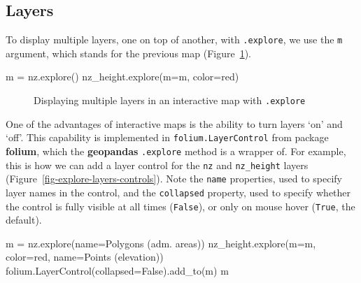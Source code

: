 \documentclass[
  letterpaper,
]{krantz}
\newenvironment{Shaded}{\begin{snugshade}}{\end{snugshade}}
\newcommand{\NormalTok}[1]{\textcolor[rgb]{0.00,0.23,0.31}{#1}}
\newcommand{\OperatorTok}[1]{\textcolor[rgb]{0.37,0.37,0.37}{#1}}
\newcommand{\StringTok}[1]{\textcolor[rgb]{0.13,0.47,0.30}{#1}}
\newcommand{\VariableTok}[1]{\textcolor[rgb]{0.07,0.07,0.07}{#1}}
\begin{document}
\subsection{Layers}\label{layers}

To display multiple layers, one on top of another, with
\texttt{.explore}, we use the \texttt{m} argument, which stands for the
previous map (Figure~\ref{fig-explore-layers}).

\begin{Shaded}
\begin{Highlighting}[]
\NormalTok{m }\OperatorTok{=}\NormalTok{ nz.explore()}
\NormalTok{nz\_height.explore(m}\OperatorTok{=}\NormalTok{m, color}\OperatorTok{=}\StringTok{\textquotesingle{}red\textquotesingle{}}\NormalTok{)}
\end{Highlighting}
\end{Shaded}

\begin{figure}


\caption{\label{fig-explore-layers}Displaying multiple layers in an
interactive map with \texttt{.explore}}

\end{figure}%

One of the advantages of interactive maps is the ability to turn layers
`on' and `off'. This capability is implemented in
\texttt{folium.LayerControl} from package \textbf{folium}, which the
\textbf{geopandas} \texttt{.explore} method is a wrapper of. For
example, this is how we can add a layer control for the \texttt{nz} and
\texttt{nz\_height} layers (Figure~\ref{fig-explore-layers-controls}).
Note the \texttt{name} properties, used to specify layer names in the
control, and the \texttt{collapsed} property, used to specify whether
the control is fully visible at all times (\texttt{False}), or only on
mouse hover (\texttt{True}, the default).

\begin{Shaded}
\begin{Highlighting}[]
\NormalTok{m }\OperatorTok{=}\NormalTok{ nz.explore(name}\OperatorTok{=}\StringTok{\textquotesingle{}Polygons (adm. areas)\textquotesingle{}}\NormalTok{)}
\NormalTok{nz\_height.explore(m}\OperatorTok{=}\NormalTok{m, color}\OperatorTok{=}\StringTok{\textquotesingle{}red\textquotesingle{}}\NormalTok{, name}\OperatorTok{=}\StringTok{\textquotesingle{}Points (elevation)\textquotesingle{}}\NormalTok{)}
\NormalTok{folium.LayerControl(collapsed}\OperatorTok{=}\VariableTok{False}\NormalTok{).add\_to(m)}
\NormalTok{m}
\end{Highlighting}
\end{Shaded}
\end{document}
